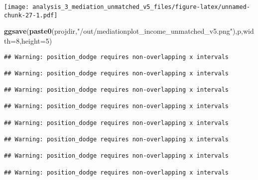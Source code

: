 \documentclass[
]{article}
\newenvironment{Shaded}{\begin{snugshade}}{\end{snugshade}}
\newcommand{\DataTypeTok}[1]{\textcolor[rgb]{0.13,0.29,0.53}{#1}}
\newcommand{\DecValTok}[1]{\textcolor[rgb]{0.00,0.00,0.81}{#1}}
\newcommand{\KeywordTok}[1]{\textcolor[rgb]{0.13,0.29,0.53}{\textbf{#1}}}
\newcommand{\NormalTok}[1]{#1}
\newcommand{\StringTok}[1]{\textcolor[rgb]{0.31,0.60,0.02}{#1}}
\begin{document}
\texttt{[image: analysis\_3\_mediation\_unmatched\_v5\_files/figure-latex/unnamed-chunk-27-1.pdf]}

\begin{Shaded}
\begin{Highlighting}[]
\KeywordTok{ggsave}\NormalTok{(}\KeywordTok{paste0}\NormalTok{(projdir,}\StringTok{"/out/mediationplot_income_unmatched_v5.png"}\NormalTok{),p,}\DataTypeTok{width=}\DecValTok{8}\NormalTok{,}\DataTypeTok{height=}\DecValTok{5}\NormalTok{)}
\end{Highlighting}
\end{Shaded}

\begin{verbatim}
## Warning: position_dodge requires non-overlapping x intervals

## Warning: position_dodge requires non-overlapping x intervals

## Warning: position_dodge requires non-overlapping x intervals

## Warning: position_dodge requires non-overlapping x intervals

## Warning: position_dodge requires non-overlapping x intervals

## Warning: position_dodge requires non-overlapping x intervals

## Warning: position_dodge requires non-overlapping x intervals

## Warning: position_dodge requires non-overlapping x intervals
\end{verbatim}
\end{document}
